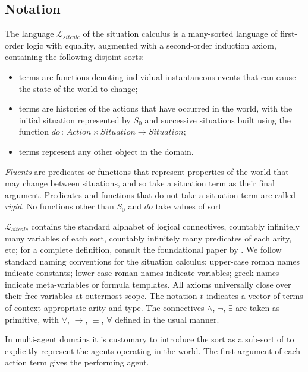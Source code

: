 \subsection{Notation\label{sec:Background:SC:Notation}}

The language $\mathcal{L}_{sitcalc}$ of the situation calculus is
a many-sorted language of first-order logic with equality, augmented
with a second-order induction axiom, containing the following disjoint
sorts:

\begin{itemize}
\item \emph{} terms are functions denoting individual instantaneous
events that can cause the state of the world to change; 
\item {} terms are histories of the actions that have occurred
in the world, with the initial situation represented by $S_{0}$ and
successive situations built using the function $do\,:\, Action\times Situation\rightarrow Situation$; 
\item {} terms represent any other object in the domain. 
\end{itemize}
\emph{Fluents} are predicates or functions that represent properties
of the world that may change between situations, and so take a situation
term as their final argument. Predicates and functions that do not
take a situation term are called \emph{rigid}. No functions other
than $S_{0}$ and $do$ take values of sort 

$\mathcal{L}_{sitcalc}$ contains the standard alphabet of logical
connectives, countably infinitely many variables of each sort, countably
infinitely many predicates of each arity, etc; for a complete definition,
consult the foundational paper by \citet{pirri99contributions_sitcalc}.
We follow standard naming conventions for the situation calculus:
upper-case roman names indicate constants; lower-case roman names
indicate variables; greek names indicate meta-variables or formula
templates. All axioms universally close over their free variables
at outermost scope. The notation $\bar{t}$ indicates a vector of
terms of context-appropriate arity and type. The connectives $\wedge$,
$\neg$, $\exists$ are taken as primitive, with $\vee$, $\rightarrow$,
$\equiv$, $\forall$ defined in the usual manner.

In multi-agent domains it is customary to introduce the sort as a sub-sort of  to explicitly represent the agents
operating in the world. The first argument of each action term gives
the performing agent.

